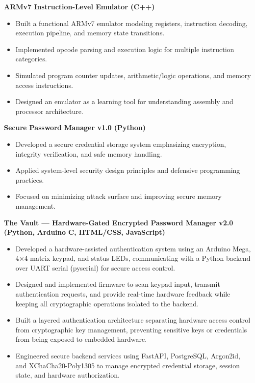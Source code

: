 \documentclass[10pt]{article}
\begin{document}
\textbf{ARMv7 Instruction-Level Emulator (C++)}
    \begin{itemize}
        \item Built a functional ARMv7 emulator modeling registers, instruction decoding, execution pipeline, and memory state transitions.
        
        \item Implemented opcode parsing and execution logic for multiple instruction categories.
        
        \item Simulated program counter updates, arithmetic/logic operations, and memory access instructions.
        
        \item Designed an emulator as a learning tool for understanding assembly and processor architecture.
    \end{itemize}
    
    \textbf{Secure Password Manager v1.0 (Python)}
    \begin{itemize}
        \item Developed a secure credential storage system emphasizing encryption, integrity verification, and safe memory handling.
        
        \item Applied system-level security design principles and defensive programming practices.
        
        \item Focused on minimizing attack surface and improving secure memory management.
    \end{itemize}

\textbf{The Vault — Hardware-Gated Encrypted Password Manager v2.0 (Python, Arduino C, HTML/CSS, JavaScript)}
    \begin{itemize}
        \item Developed a hardware-assisted authentication system using an Arduino Mega, 4×4 matrix keypad, and status LEDs, communicating with a Python backend over UART serial (pyserial) for secure access control.
        
        \item Designed and implemented firmware to scan keypad input, transmit authentication requests, and provide real-time hardware feedback while keeping all cryptographic operations isolated to the backend.
        
        \item Built a layered authentication architecture separating hardware access control from cryptographic key management, preventing sensitive keys or credentials from being exposed to embedded hardware.
        
        \item Engineered secure backend services using FastAPI, PostgreSQL, Argon2id, and XChaCha20-Poly1305 to manage encrypted credential storage, session state, and hardware authorization.
    \end{itemize}
\end{document}
